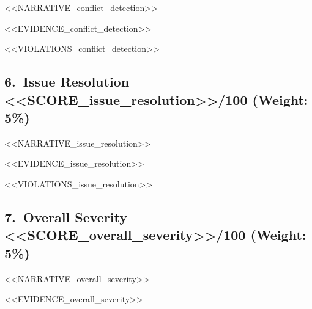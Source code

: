\documentclass[12pt,a4paper]{article}
\begin{document}
<<NARRATIVE_conflict_detection>>

\begin{tcolorbox}[evidencebox]
\begin{itemize}[leftmargin=1.2em, itemsep=2pt, topsep=0pt]
<<EVIDENCE_conflict_detection>>
\end{itemize}
\end{tcolorbox}

\begin{tcolorbox}[violationbox]
\begin{itemize}[leftmargin=1.2em, itemsep=2pt, topsep=0pt]
<<VIOLATIONS_conflict_detection>>
\end{itemize}
\end{tcolorbox}

\subsection{6.\ Issue Resolution \hfill
  \textcolor{<<COLOR_issue_resolution>>}{<<SCORE_issue_resolution>>/100}
  \normalfont\small\quad(Weight: 5\%)}

<<NARRATIVE_issue_resolution>>

\begin{tcolorbox}[evidencebox]
\begin{itemize}[leftmargin=1.2em, itemsep=2pt, topsep=0pt]
<<EVIDENCE_issue_resolution>>
\end{itemize}
\end{tcolorbox}

\begin{tcolorbox}[violationbox]
\begin{itemize}[leftmargin=1.2em, itemsep=2pt, topsep=0pt]
<<VIOLATIONS_issue_resolution>>
\end{itemize}
\end{tcolorbox}

\subsection{7.\ Overall Severity \hfill
  \textcolor{<<COLOR_overall_severity>>}{<<SCORE_overall_severity>>/100}
  \normalfont\small\quad(Weight: 5\%)}

<<NARRATIVE_overall_severity>>

\begin{tcolorbox}[evidencebox]
\begin{itemize}[leftmargin=1.2em, itemsep=2pt, topsep=0pt]
<<EVIDENCE_overall_severity>>
\end{itemize}
\end{tcolorbox}
\end{document}
